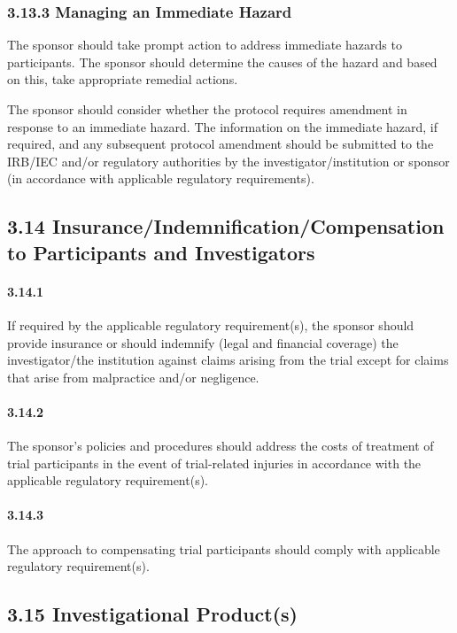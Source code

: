 \documentclass[11pt]{article}
\begin{document}
\subsubsection{3.13.3 Managing an Immediate Hazard}

The sponsor should take prompt action to address immediate hazards to participants. The sponsor should determine the causes of the hazard and based on this, take appropriate remedial actions.


The sponsor should consider whether the protocol requires amendment in response to an immediate hazard. The information on the immediate hazard, if required, and any subsequent protocol amendment should be submitted to the IRB/IEC and/or regulatory authorities by the investigator/institution or sponsor (in accordance with applicable regulatory requirements).


\subsection{3.14 Insurance/Indemnification/Compensation to Participants and Investigators}

\paragraph{3.14.1} If required by the applicable regulatory requirement(s), the sponsor should provide insurance or should indemnify (legal and financial coverage) the investigator/the institution against claims arising from the trial except for claims that arise from malpractice and/or negligence.

\paragraph{3.14.2} The sponsor's policies and procedures should address the costs of treatment of trial participants in the event of trial-related injuries in accordance with the applicable regulatory requirement(s).

\paragraph{3.14.3} The approach to compensating trial participants should comply with applicable regulatory requirement(s).

\subsection{3.15 Investigational Product(s)}
\end{document}
